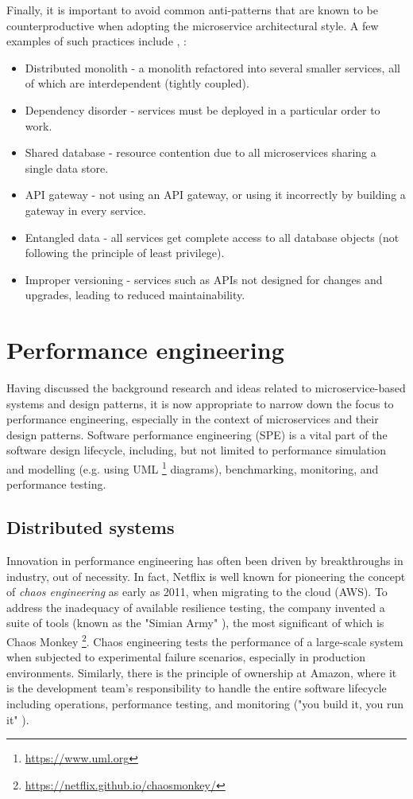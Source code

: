 Finally, it is important to avoid common anti-patterns that are known to be counterproductive when adopting the microservice architectural style. A few examples of such practices include \cite{alagarasan15}, \cite{kanjilal21}:

\begin{itemize}
	\item Distributed monolith - a monolith refactored into several smaller services, all of which are interdependent (tightly coupled).
	\item Dependency disorder - services must be deployed in a particular order to work.
	\item Shared database - resource contention due to all microservices sharing a single data store.
	\item API gateway - not using an API gateway, or using it incorrectly by building a gateway in every service.
	\item Entangled data - all services get complete access to all database objects (not following the principle of least privilege).
	\item Improper versioning - services such as APIs not designed for changes and upgrades, leading to reduced maintainability.
\end{itemize}

\section{Performance engineering}

Having discussed the background research and ideas related to microservice-based systems and design patterns, it is now appropriate to narrow down the focus to performance engineering, especially in the context of microservices and their design patterns. Software performance engineering (SPE) is a vital part of the software design lifecycle, including, but not limited to performance simulation and modelling (e.g. using UML \footnote{\url{https://www.uml.org}} diagrams), benchmarking, monitoring, and performance testing.

\subsection{Distributed systems}

Innovation in performance engineering has often been driven by breakthroughs in industry, out of necessity. In fact, Netflix is well known for pioneering the concept of \textit{chaos engineering} as early as 2011, when migrating to the cloud (AWS). To address the inadequacy of available resilience testing, the company invented a suite of tools (known as the "Simian Army" \cite{netflix-chaos}), the most significant of which is Chaos Monkey \footnote{\url{https://netflix.github.io/chaosmonkey/}}.
Chaos engineering tests the performance of a large-scale system when subjected to experimental failure scenarios, especially in production environments. Similarly, there is the principle of ownership at Amazon, where it is the development team's responsibility to handle the entire software lifecycle including operations, performance testing, and monitoring ("you build it, you run it" \cite{ohanlon06}).

